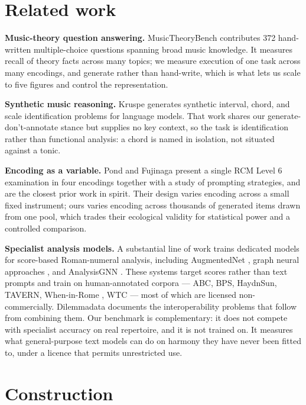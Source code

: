 \documentclass[11pt]{article}
\begin{document}
\section{Related work}

\textbf{Music-theory question answering.} MusicTheoryBench \cite{chatmusician}
contributes 372 hand-written multiple-choice questions spanning broad music
knowledge. It measures recall of theory facts across many topics; we measure
execution of one task across many encodings, and generate rather than
hand-write, which is what lets us scale to five figures and control the
representation.

\textbf{Synthetic music reasoning.} Kruspe \cite{kruspe} generates synthetic
interval, chord, and scale identification problems for language models. That
work shares our generate-don't-annotate stance but supplies no key context, so
the task is identification rather than functional analysis: a chord is named in
isolation, not situated against a tonic.

\textbf{Encoding as a variable.} Pond and Fujinaga \cite{pond} present a single
RCM Level 6 examination in four encodings together with a study of prompting
strategies, and are the closest prior work in spirit. Their design varies
encoding across a small fixed instrument; ours varies encoding across thousands
of generated items drawn from one pool, which trades their ecological validity
for statistical power and a controlled comparison.

\textbf{Specialist analysis models.} A substantial line of work trains dedicated
models for score-based Roman-numeral analysis, including AugmentedNet
\cite{augmentednet}, graph neural approaches \cite{rnagnn}, and AnalysisGNN
\cite{analysisgnn}. These systems target scores rather than text prompts and
train on human-annotated corpora --- ABC, BPS, HaydnSun, TAVERN, When-in-Rome
\cite{wir}, WTC --- most of which are licensed non-commercially. Dilemmadata
\cite{dilemmadata} documents the interoperability problems that follow from
combining them. Our benchmark is complementary: it does not compete with
specialist accuracy on real repertoire, and it is not trained on. It measures
what general-purpose text models can do on harmony they have never been fitted
to, under a licence that permits unrestricted use.

\section{Construction}
\end{document}
